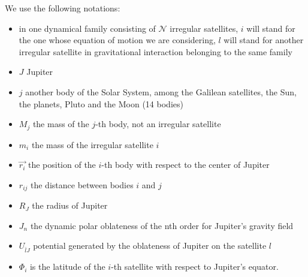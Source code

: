 \documentclass[useAMS,usenatbib]{mn2e}
\begin{document}
We use the following notations: \begin{itemize}
\item in one dynamical family consisting of $\mathcal{N}$ irregular satellites, $i$ will stand for the one whose equation of motion we are considering, $l$ will stand for another irregular satellite in gravitational interaction belonging to the same family
\item $J$ Jupiter
\item $j$ another body of the Solar System, among the Galilean satellites, the Sun, the planets, Pluto and the Moon (14 bodies)
\item $M_j$ the mass of the $j$-th body, not an irregular satellite
\item $m_i$ the mass of the irregular satellite $i$
\item $\vec{r_i}$ the position of the $i$-th body with respect to the center of Jupiter
\item $r_{ij}$ the distance between bodies $i$ and $j$
\item $R_J$ the radius of Jupiter
\item $J_n$ the dynamic polar oblateness of the nth order for Jupiter's gravity field
\item $U_{\bar{l}\hat{J}}$ potential generated by the oblateness of Jupiter on the satellite $l$
\item $\Phi_i$ is the latitude of the $i$-th satellite with respect to Jupiter's equator.
\end{itemize}
\end{document}
